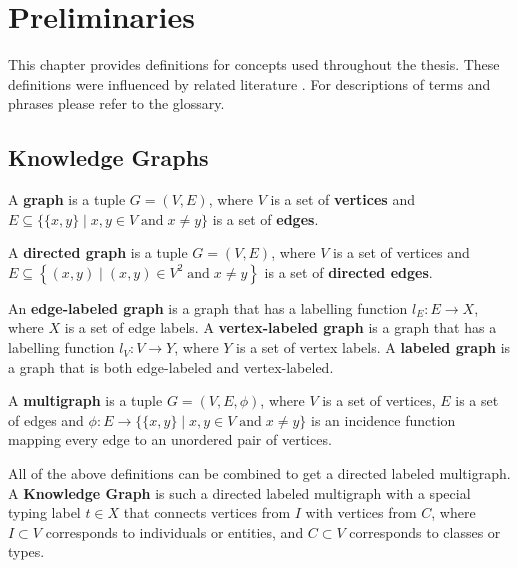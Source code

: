 \chapter{Preliminaries} \label{ch:preliminaries}
This chapter provides definitions for concepts used throughout the thesis. These definitions were influenced by related literature \cite{Hogan2021KG, wikiGraph, acostaKG}. For descriptions of terms and phrases please refer to the glossary.


\section{Knowledge Graphs}

\begin{definition}[Graph]
    A \textbf{graph} is a tuple $G = (V, E)$, where $V$ is a set of \textbf{vertices} and $\displaystyle E\subseteq \{\{x,y\}\mid x,y\in V\;{\textrm {and}}\;x\neq y\}$ is a set of \textbf{edges}.
\end{definition}

\begin{definition}
    A \textbf{directed graph} is a tuple $G = (V,E)$, where $V$ is a set of vertices and $\displaystyle E\subseteq \left\{(x,y)\mid (x,y)\in V^{2}\;{\textrm {and}}\;x\neq y\right\}$ is a set of \textbf{directed edges}.
\end{definition}

\begin{definition}
    An \textbf{edge-labeled graph} is a graph that has a labelling function $l_E : E \rightarrow X$, where $X$ is a set of edge labels.
    A \textbf{vertex-labeled graph} is a graph that has a labelling function $l_V : V \rightarrow Y$, where $Y$ is a set of vertex labels.
    A \textbf{labeled graph} is a graph that is both edge-labeled and vertex-labeled.
\end{definition}

\begin{definition}[Multigraph]
    A \textbf{multigraph} is a tuple $\displaystyle G=(V,E,\phi )$, where $V$ is a set of vertices, $E$ is a set of edges and $\displaystyle \phi :E\to \{\{x,y\}\mid x,y\in V\;{\textrm {and}}\;x\neq y\}$ is an incidence function mapping every edge to an unordered pair of vertices.
\end{definition}

\begin{definition}
    All of the above definitions can be combined to get a directed labeled multigraph.
    A \textbf{Knowledge Graph} is such a directed labeled multigraph with a special typing label $t \in X$ that connects vertices from $I$ with vertices from $C$, where $I \subset V$ corresponds to individuals or entities, and $C \subset V$ corresponds to classes or types.
\end{definition}


